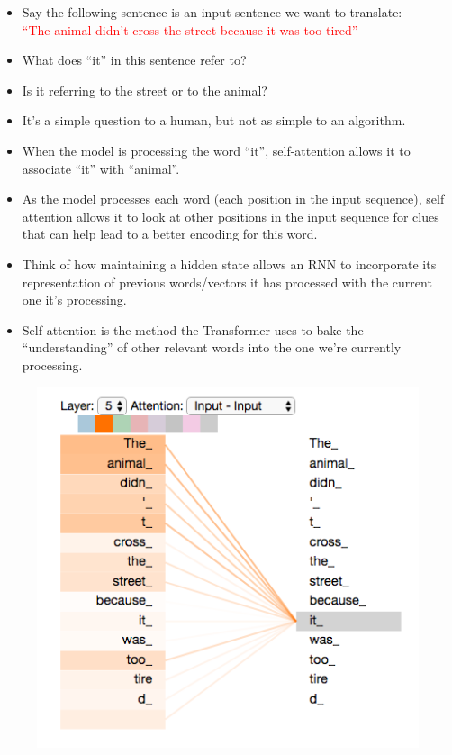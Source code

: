 \begin{itemize}

\item Say the following sentence is an input sentence we want to translate: 
\\ \textcolor{red}{``The animal didn't cross the street because it was too tired''}

\item What does ``it'' in this sentence refer to? 

\item Is it referring to the street or to the animal? 
\item It's a simple question to a human, but not as simple to an algorithm.

\item When the model is processing the word ``it'', self-attention allows it to associate ``it'' with ``animal''.

\item As the model processes each word (each position in the input sequence), self attention allows it to look at other positions in the input sequence for clues that can help lead to a better encoding for this word.

\item Think of how maintaining a hidden state allows an RNN to incorporate its representation of previous words/vectors it has processed with the current one it's processing. 

\item Self-attention is the method the Transformer uses to bake the ``understanding'' of other relevant words into the one we're currently processing.


\end{itemize}


\begin{figure}[h]
        	\includegraphics[scale = 0.35]{pics/transformer_self-attention_visualization.png}
        \end{figure}  



